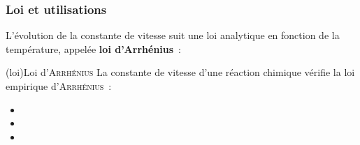 \documentclass[../../main/main.tex]{subfiles}
\begin{document}
\subsubsection{Loi et utilisations}

L'évolution de la constante de vitesse suit une loi analytique en fonction de la
température, appelée \textbf{loi d'Arrhénius}~:
\begin{tcb}[label=loi:arrhenius, breakable](loi){Loi d'\textsc{Arrhénius}}
	La constante de vitesse d'une réaction chimique vérifie la loi empirique
	d'\textsc{Arrhénius}~:
	\psw{%
		\[\boxed{k(T) = A\exp \left( - \frac{\Ec_a}{RT} \right)}\]
	}%
	\vspace{-15pt}
	\begin{itemize}
		\item {}%
		\item {}%
		\item {}%
	\end{itemize}
\end{tcb}
\end{document}
